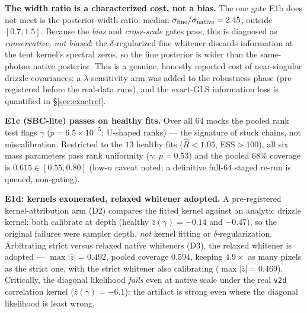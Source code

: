 \documentclass[11pt,letterpaper]{article}
\newcommand{\gammaEPL}{\ensuremath{\gamma}}
\newcommand{\Rhat}{\ensuremath{\hat{R}}}
\newcommand{\dfile}[1]{\texttt{#1}}
\begin{document}
{\bf The width ratio is a characterized cost, not a bias.} The one gate E1b
does not meet is the posterior-width ratio: median
$\sigma_{\rm fine}/\sigma_{\rm native}=2.45$, outside $[0.7,1.5]$. Because the
{\it bias} and {\it cross-scale} gates pass, this is diagnosed as {\it
conservative, not biased}: the $\delta$-regularized fine whitener discards
information at the tent kernel's spectral zeros, so the fine posterior is wider
than the same-photon native posterior. This is a genuine, honestly reported
cost of near-singular drizzle covariances; a $\lambda$-sensitivity arm was added
to the robustness phase (pre-registered before the real-data runs), and the
exact-GLS information loss is quantified in \S\ref{sec:exactref}.

{\bf E1c (SBC-lite) passes on healthy fits.} Over all $64$ mocks the pooled
rank test flags $\gammaEPL$ ($p=6.5\times10^{-5}$; U-shaped ranks) --- the
signature of stuck chains, not miscalibration. Restricted to the $13$ healthy
fits ($\Rhat<1.05$, ESS$>100$), all six mass parameters pass rank uniformity
($\gammaEPL$: $p=0.53$) and the pooled $68\%$ coverage is $0.615\in[0.55,0.80]$
(low-$n$ caveat noted; a definitive full-$64$ staged re-run is queued,
non-gating).

{\bf E1d: kernels exonerated, relaxed whitener adopted.} A pre-registered
kernel-attribution arm (D2) compares the fitted kernel against an analytic
drizzle kernel: both calibrate at depth (healthy $\bar z(\gammaEPL)=-0.14$ and
$-0.47$), so the original failures were sampler depth, {\it not} kernel fitting
or $\delta$-regularization. Arbitrating strict versus relaxed native whiteners
(D3), the relaxed whitener is adopted --- $\max|\bar z|=0.492$, pooled coverage
$0.594$, keeping $4.9\times$ as many pixels as the strict one, with the strict
whitener also calibrating ($\max|\bar z|=0.469$). Critically, the diagonal
likelihood {\it fails} even at native scale under the real \dfile{v2d}
correlation kernel ($\bar z(\gammaEPL)=-6.1$): the artifact is strong even where
the diagonal likelihood is least wrong.
\end{document}
